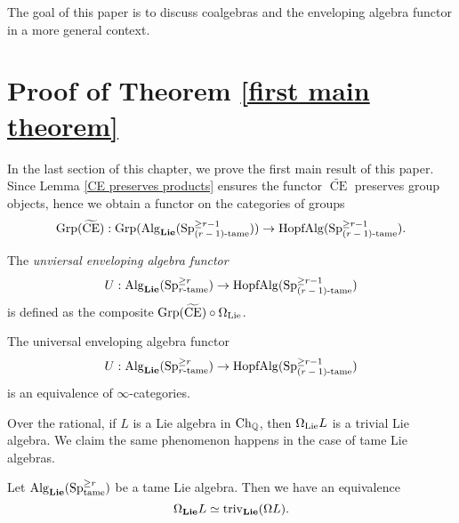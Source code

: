 The goal of this paper is to discuss coalgebras and the enveloping algebra functor in a more general context. 


\section{Proof of Theorem \ref{first main theorem}}
In the last section of this chapter, we prove the first main result of this paper. Since Lemma \ref{CE preserves products} ensures the functor $\widetilde{\operatorname{CE}}$ preserves group objects, hence we obtain a functor on the categories of groups
\[
	\operatorname{Grp}(\widetilde{\operatorname{CE}}):
	\operatorname{Grp}(\operatorname{Alg}_{\mathbf{Lie}}(\operatorname{Sp}^{\geq r-1}_{\text{($r-1$)-tame}}))
	\to 
	\operatorname{HopfAlg}(\operatorname{Sp}^{\geq r-1}_{\text{($r-1$)-tame}}).
\]
	
\begin{definition}
	The \emph{unviersal enveloping algebra functor}
	$$
	U: \operatorname{Alg}_{\mathbf{Lie}}(\operatorname{Sp}^{\geq r}_{\text{$r$-tame}}) 
	\to 
	\operatorname{HopfAlg}(\operatorname{Sp}^{\geq r-1}_{\text{($r-1$)-tame}})
	$$
	is defined as the composite $\operatorname{Grp}(\widetilde{\operatorname{CE}}) \circ \Omega_{\operatorname{Lie}}$.
\end{definition}

	
\begin{theorem}
\label{first main theorem}
	The universal enveloping algebra functor
	$$
	U: \operatorname{Alg}_{\mathbf{Lie}}(\operatorname{Sp}^{\geq r}_{\text{$r$-tame}})  
	\to
	\operatorname{HopfAlg}(\operatorname{Sp}^{\geq r-1}_{\text{($r-1$)-tame}})
	$$
	is an equivalence of $\infty$-categories.
\end{theorem}

Over the rational, if $L$ is a Lie algebra in $\operatorname{Ch}_{{\mathbb{Q}}}$, then $\Omega_{\operatorname{Lie}}L$ is a trivial Lie algebra.
We claim the same phenomenon happens in the case of tame Lie algebras.

\begin{proposition}
\label{Triviality of loop of an O-algebra}
	Let $\operatorname{Alg}_{\mathbf{Lie}}(\operatorname{Sp}^{\geq r}_{\operatorname{\operatorname{tame}}}) $ be a tame Lie algebra.
	Then we have an equivalence
	$$
	\Omega_{\mathbf{Lie}} L\simeq \operatorname{triv}_{\mathbf{Lie}}(\Omega L).
	$$ 
\end{proposition}

